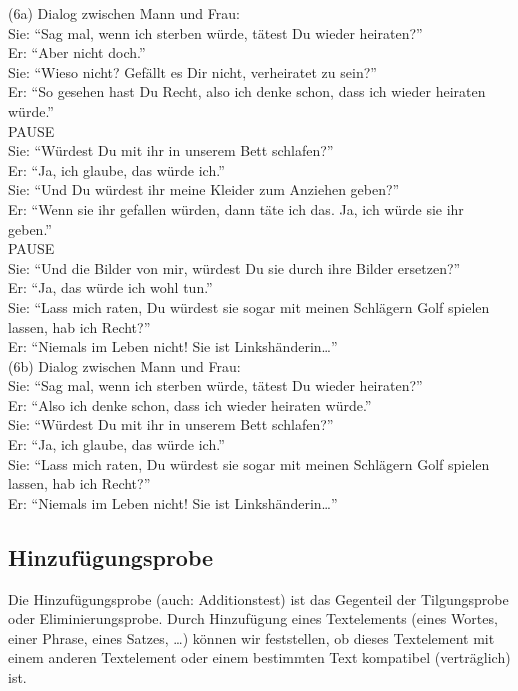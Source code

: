 \documentclass[
  letterpaper,
  DIV=11,
  numbers=noendperiod]{scrreprt}
\begin{document}
(6a) Dialog zwischen Mann und Frau:\\
Sie: ``Sag mal, wenn ich sterben würde, tätest Du wieder heiraten?''\\
Er: ``Aber nicht doch.''\\
Sie: ``Wieso nicht? Gefällt es Dir nicht, verheiratet zu sein?''\\
Er: ``So gesehen hast Du Recht, also ich denke schon, dass ich wieder
heiraten würde.''\\
PAUSE\\
Sie: ``Würdest Du mit ihr in unserem Bett schlafen?''\\
Er: ``Ja, ich glaube, das würde ich.''\\
Sie: ``Und Du würdest ihr meine Kleider zum Anziehen geben?''\\
Er: ``Wenn sie ihr gefallen würden, dann täte ich das. Ja, ich würde sie
ihr geben.''\\
PAUSE\\
Sie: ``Und die Bilder von mir, würdest Du sie durch ihre Bilder
ersetzen?''\\
Er: ``Ja, das würde ich wohl tun.''\\
Sie: ``Lass mich raten, Du würdest sie sogar mit meinen Schlägern Golf
spielen lassen, hab ich Recht?''\\
Er: ``Niemals im Leben nicht! Sie ist Linkshänderin\ldots{}''\\

(6b) Dialog zwischen Mann und Frau:\\
Sie: ``Sag mal, wenn ich sterben würde, tätest Du wieder heiraten?''\\
Er: ``Also ich denke schon, dass ich wieder heiraten würde.''\\
Sie: ``Würdest Du mit ihr in unserem Bett schlafen?''\\
Er: ``Ja, ich glaube, das würde ich.''\\
Sie: ``Lass mich raten, Du würdest sie sogar mit meinen Schlägern Golf
spielen lassen, hab ich Recht?''\\
Er: ``Niemals im Leben nicht! Sie ist Linkshänderin\ldots{}''\\

\hypertarget{hinzufuxfcgungsprobe}{%
\subsection{Hinzufügungsprobe}\label{hinzufuxfcgungsprobe}}

Die Hinzufügungsprobe (auch: Additionstest) ist das Gegenteil der
Tilgungsprobe oder Eliminierungsprobe. Durch Hinzufügung eines
Textelements (eines Wortes, einer Phrase, eines Satzes, \ldots) können
wir feststellen, ob dieses Textelement mit einem anderen Textelement
oder einem bestimmten Text kompatibel (verträglich) ist.
\end{document}
